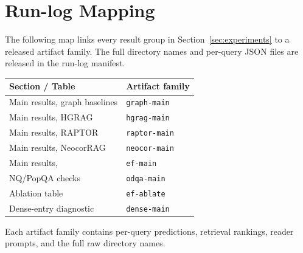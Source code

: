 \section{Run-log Mapping}
\label{app:runlogs}

The following map links every result group in
Section~\ref{sec:experiments} to a released artifact family. The full
directory names and per-query JSON files are released in the run-log
manifest.

\begin{center}
\centering
\small
\setlength{\tabcolsep}{5pt}
\begin{tabular}{ll}
\toprule
Section / Table & Artifact family \\
\midrule
Main results, graph baselines      & \texttt{graph-main} \\
Main results, HGRAG                & \texttt{hgrag-main} \\
Main results, RAPTOR               & \texttt{raptor-main} \\
Main results, NeocorRAG            & \texttt{neocor-main} \\
Main results, \methodname{}        & \texttt{ef-main} \\
NQ/PopQA checks                    & \texttt{odqa-main} \\
Ablation table                     & \texttt{ef-ablate} \\
Dense-entry diagnostic             & \texttt{dense-main} \\
\bottomrule
\end{tabular}
\end{center}

Each artifact family contains per-query predictions, retrieval
rankings, reader prompts, and the full raw directory names.
